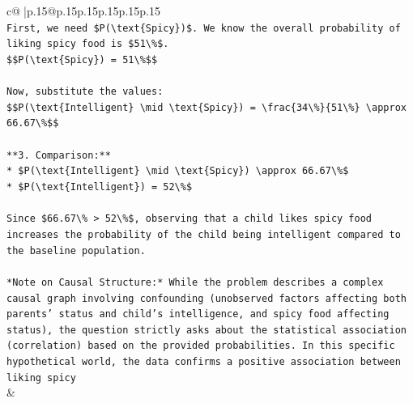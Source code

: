 \documentclass{article}
\begin{document}
{\begin{supertabular}{c@{$\;$}|p{.15\linewidth}@{}p{.15\linewidth}p{.15\linewidth}p{.15\linewidth}p{.15\linewidth}p{.15\linewidth}}
{{{\\ 
\texttt{First, we need \$P(\textbackslash{}text\{Spicy\})\$. We know the overall probability of liking spicy food is \$51\textbackslash{}\%\$.} \\
\texttt{\$\$P(\textbackslash{}text\{Spicy\}) = 51\textbackslash{}\%\$\$} \\
\\ 
\texttt{Now, substitute the values:} \\
\texttt{\$\$P(\textbackslash{}text\{Intelligent\} \textbackslash{}mid \textbackslash{}text\{Spicy\}) = \textbackslash{}frac\{34\textbackslash{}\%\}\{51\textbackslash{}\%\} \textbackslash{}approx 66.67\textbackslash{}\%\$\$} \\
\\ 
\texttt{**3. Comparison:**} \\
\texttt{*   \$P(\textbackslash{}text\{Intelligent\} \textbackslash{}mid \textbackslash{}text\{Spicy\}) \textbackslash{}approx 66.67\textbackslash{}\%\$} \\
\texttt{*   \$P(\textbackslash{}text\{Intelligent\}) = 52\textbackslash{}\%\$} \\
\\ 
\texttt{Since \$66.67\textbackslash{}\% > 52\textbackslash{}\%\$, observing that a child likes spicy food increases the probability of the child being intelligent compared to the baseline population.} \\
\\ 
\texttt{*Note on Causal Structure:* While the problem describes a complex causal graph involving confounding (unobserved factors affecting both parents' status and child's intelligence, and spicy food affecting status), the question strictly asks about the statistical association (correlation) based on the provided probabilities. In this specific hypothetical world, the data confirms a positive association between liking spicy} \\
            }
        }
    }
    & \\ \\


\end{supertabular}}
\end{document}
